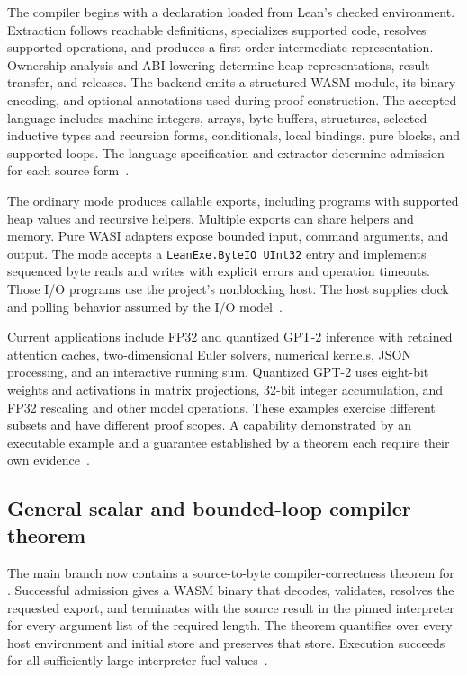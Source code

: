 \documentclass[11pt]{article}
\begin{document}
The compiler begins with a declaration loaded from Lean's checked environment.  Extraction follows reachable definitions, specializes supported code, resolves supported operations, and produces a first-order intermediate representation.  Ownership analysis and ABI lowering determine heap representations, result transfer, and releases.  The backend emits a structured WASM module, its binary encoding, and optional annotations used during proof construction.  The accepted language includes machine integers, arrays, byte buffers, structures, selected inductive types and recursion forms, conditionals, local bindings, pure  blocks, and supported loops.  The language specification and extractor determine admission for each source form~\cite{leanexe-main}.

The ordinary  mode produces callable exports, including programs with supported heap values and recursive helpers.  Multiple exports can share helpers and memory.  Pure WASI adapters expose bounded input, command arguments, and output.  The  mode accepts a \texttt{LeanExe.ByteIO UInt32} entry and implements sequenced byte reads and writes with explicit errors and operation timeouts.  Those I/O programs use the project's nonblocking host.  The host supplies clock and polling behavior assumed by the I/O model~\cite{leanexe-main}.

Current applications include FP32 and quantized GPT-2 inference with retained attention caches, two-dimensional Euler solvers, numerical kernels, JSON processing, and an interactive running sum.  Quantized GPT-2 uses eight-bit weights and activations in matrix projections, 32-bit integer accumulation, and FP32 rescaling and other model operations.  These examples exercise different subsets and have different proof scopes.  A capability demonstrated by an executable example and a guarantee established by a theorem each require their own evidence~\cite{leanexe-main}.

\subsection{General scalar and bounded-loop compiler theorem}

The main branch now contains a source-to-byte compiler-correctness theorem for .  Successful admission gives a WASM binary that decodes, validates, resolves the requested export, and terminates with the source result in the pinned interpreter for every argument list of the required length.  The theorem quantifies over every host environment and initial store and preserves that store.  Execution succeeds for all sufficiently large interpreter fuel values~\cite{compiler-source}.
\end{document}
